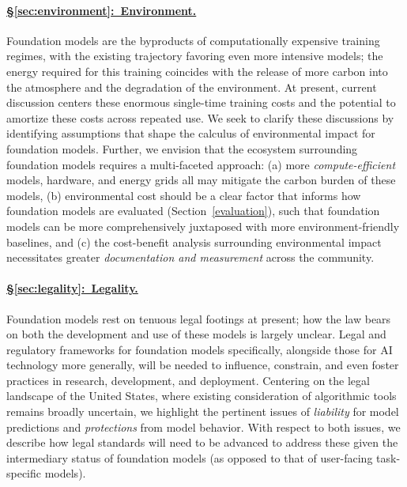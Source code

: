 \paragraph{\hyperref[sec:environment]{§\ref{sec:environment}:~Environment.}}

Foundation models are the byproducts of computationally expensive training regimes, with the existing trajectory favoring even more intensive models; the energy required for this training coincides with the release of more carbon into the atmosphere and the degradation of the environment. At present, current discussion centers these enormous single-time training costs and the potential to amortize these costs across repeated use. We seek to clarify these discussions by identifying assumptions that shape the calculus of environmental impact for foundation models. Further, we envision that the ecosystem surrounding foundation models requires a multi-faceted approach: (a) more \textit{compute-efficient} models, hardware, and energy grids all may mitigate the carbon burden of these models, (b) environmental cost should be a clear factor that informs how foundation models are evaluated (Section~\ref{evaluation}), such that foundation models can be more comprehensively juxtaposed with more environment-friendly baselines, and (c) the cost-benefit analysis surrounding environmental impact necessitates greater \textit{documentation and measurement} across the community.

\paragraph{\hyperref[sec:legality]{§\ref{sec:legality}:~Legality.}}

Foundation models rest on tenuous legal footings at present; how the law bears on both the development and use of these models is largely unclear. Legal and regulatory frameworks for foundation models specifically, alongside those for AI technology more generally, will be needed to influence, constrain, and even foster practices in research, development, and deployment. Centering on the legal landscape of the United States, where existing consideration of algorithmic tools remains broadly uncertain, we highlight the pertinent issues of \textit{liability} for model predictions and \textit{protections} from model behavior. With respect to both issues, we describe how legal standards will need to be advanced to address these given the intermediary status of foundation models (as opposed to that of user-facing task-specific models). 

